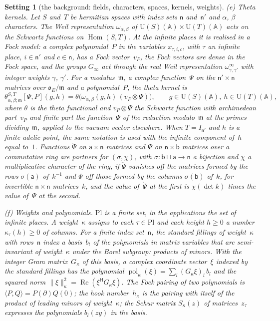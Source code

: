 \documentclass[11pt,a4paper]{article}
\newcommand{\kw}[1]{\emph{#1}}
\newcommand{\m}[1]{\mbox{$#1$}}        %
\theoremstyle{plainx}
\theoremstyle{uprightx}
\newtheorem{setting}[theorem]{Setting}          %
\newcommand{\AAA}{\mathbb{A}}
\newcommand{\ix}[1]{\mathsf{#1}}
\newcommand{\OEr}{\mathfrak{o}_E}
\newcommand{\UU}{\mathrm{U}}
\newcommand{\ip}[2]{\langle #1,#2\rangle}
\newcommand{\tk}[7]{\theta^{#1,#2}_{#3,#4;#5}[#6,#7]}
\newcommand{\herm}{^{\mathsf{H}}}
\newcommand{\dL}{\check{\Psi}}         %
\newcommand{\Plc}{\mathrm{Pl}}         %
\begin{document}
\begin{setting}[the background: fields, characters, spaces, kernels, weights]
\emph{(e) Theta kernels.} Let $S$ and~$T$ be hermitian spaces with index sets $\ix n$ and~$\ix n'$ and $\alpha$,
$\beta$ characters. The Weil representation \m{\omega_{\alpha,\beta}} of \m{\UU(S)(\AAA)\times\UU(T)(\AAA)} acts on
the Schwartz functions on \m{\operatorname{Hom}(S,T)}. At the infinite places it is realised in a Fock model: a
complex polynomial~$P$ in the variables \m{x_{\tau,i,c}}, with $\tau$ an infinite place, \m{i\in\ix n'} and
\m{c\in\ix n}, has a \kw{Fock vector}~$v_P$, the Fock vectors are dense in the Fock space, and the groups
\m{G_\infty} act through the \kw{real Weil representation} \m{\omega^{\infty}_{\gamma,\gamma'}} with integer
weights $\gamma$, $\gamma'$. For a modulus~$\mathfrak{m}$, a complex function~$\Psi$ on the \m{\ix n'\times\ix n}
matrices over \m{\OEr/\mathfrak{m}} and a polynomial~$P$, the \kw{theta kernel} is
\[\tk{S}{T}{\alpha}{\beta}{\mathfrak{m}}{\Psi}{P}(g,h)=\theta\bigl(\omega_{\alpha,\beta}(g,h)\,(v_P\otimes\Psi)\bigr),\qquad g\in\UU(S)(\AAA),\ h\in\UU(T)(\AAA),\]
where $\theta$ is the theta functional and \m{v_P\otimes\Psi} the Schwartz function with archimedean part~$v_P$
and finite part the function~$\Psi$ of the reduction modulo~$\mathfrak{m}$ at the primes dividing~$\mathfrak{m}$,
applied to the vacuum vector elsewhere. When \m{T=I_{\ix n'}} and $h$ is a finite adelic point, the same notation
is used with the infinite component of~$h$ equal to~$1$. Functions $\dL$ on \m{\ix a\times\ix n} matrices and $\Psi$
on \m{\ix n\times\ix b} matrices over a commutative ring are \kw{partners for} \m{(\sigma,\chi)}, with
\m{\sigma\colon\ix b\sqcup\ix a\to\ix n} a bijection and $\chi$ a multiplicative character of the ring, if $\dL$
vanishes off the matrices formed by the rows \m{\sigma(\ix a)} of~$k^{-1}$ and $\Psi$ off those formed by the columns
\m{\sigma(\ix b)} of~$k$, for invertible \m{\ix n\times\ix n} matrices~$k$, and the value of~$\dL$ at the first is
\m{\chi(\det k)} times the value of~$\Psi$ at the second.

\emph{(f) Weights and polynomials.} $\Plc$ is a finite set, in the applications the set of infinite places. A
\kw{weight}~$\kappa$ assigns to each \m{\tau\in\Plc} and each height \m{h\ge0} a number \m{\kappa_\tau(h)\ge0} of
columns. For a finite index set~$\ix n$, the \kw{standard fillings} of weight~$\kappa$ with rows~$\ix n$ index a
basis~$b_l$ of the polynomials in matrix variables that are semi-invariant of weight~$\kappa$ under the Borel
subgroup: products of minors. With the integer Gram matrix~$G_\kappa$ of this basis, a complex coordinate
vector~$\xi$ indexed by the standard fillings has the polynomial
\m{\operatorname{pol}_\kappa(\xi)=\sum_l(G_\kappa\xi)_l\,b_l} and the squared norm
\m{\|\xi\|_\kappa^2=\operatorname{Re}(\xi\herm G_\kappa\xi)}. The \kw{Fock pairing} of two polynomials is
\m{\ip{P}{Q}=P(\partial)Q(0)}; the \kw{hook number}~$h_\kappa$ is the pairing with itself of the product of leading
minors of weight~$\kappa$; the \kw{Schur matrix} \m{S_\kappa(z)} of matrices~$z_\tau$ expresses the polynomials
\m{b_l(zy)} in the basis.
\end{setting}
\end{document}
